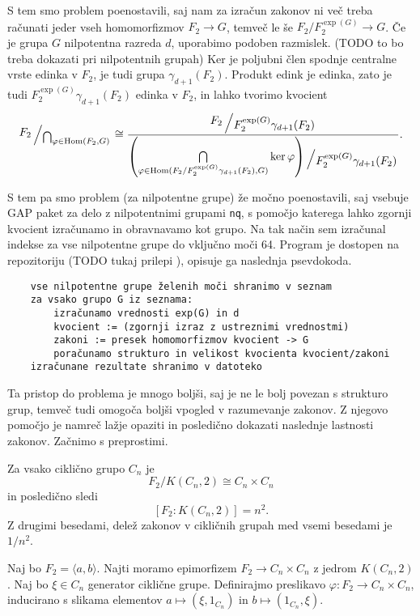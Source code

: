 \documentclass[mat1, tisk]{fmfdelo}
\newcommand{\bigslant}[2]{{\raisebox{.2em}{$#1$}\left/\raisebox{-.2em}{$#2$}\right.}}
\numberwithin{equation}{section}  %
\begin{document}
S tem smo problem poenostavili, saj nam za izračun zakonov ni več treba računati jeder vseh homomorfizmov $F_2 \to G$, temveč le še $F_2 / F_2^{\exp(G)} \to G$.
Če je grupa $G$ nilpotentna razreda $d$, uporabimo podoben razmislek. 
 (TODO to bo treba dokazati pri nilpotentnih grupah) 
Ker je poljubni člen spodnje centralne vrste edinka v $F_2$, je tudi grupa $\gamma_{d+ 1}(F_2)$.
Produkt edink je edinka, zato je tudi $F_2^{\exp(G)} \gamma_{d+ 1}(F_2)$ edinka v $F_2$, in lahko tvorimo kvocient 
\begin{equation*}
    \bigslant{F_2}{\bigcap_{\varphi \in \operatorname{Hom}(F_2, G)}} \cong \dfrac{\bigslant{F_2}{F_2^{\exp(G)}\gamma_{d+1}(F_2)}}{ \bigslant{ \left( \bigcap\limits_{\varphi \in \operatorname{Hom}({F_2} / {F_2^{\exp(G)}\gamma_{d+1}(F_2)}, G)} \ker \varphi \right) }{F_2^{\exp(G)}\gamma_{d+1}(F_2)}}.
\end{equation*}

S tem pa smo problem (za nilpotentne grupe) že močno poenostavili, saj vsebuje GAP paket za delo z nilpotentnimi grupami \texttt{nq}, s pomočjo katerega lahko zgornji kvocient izračunamo in obravnavamo kot grupo.
Na tak način sem izračunal indekse za vse nilpotentne grupe do vključno moči 64. Program je dostopen na repozitoriju (TODO tukaj prilepi ), opisuje ga naslednja psevdokoda. 

\begin{verbatim}
    vse nilpotentne grupe želenih moči shranimo v seznam 
    za vsako grupo G iz seznama:
        izračunamo vrednosti exp(G) in d
        kvocient := (zgornji izraz z ustreznimi vrednostmi)
        zakoni := presek homomorfizmov kvocient -> G
        poračunamo strukturo in velikost kvocienta kvocient/zakoni
    izračunane rezultate shranimo v datoteko
\end{verbatim}

Ta pristop do problema je mnogo boljši, saj je ne le bolj povezan s strukturo grup, temveč tudi omogoča boljši vpogled v razumevanje zakonov.
Z njegovo pomočjo je namreč lažje opaziti in posledično dokazati naslednje lastnosti zakonov. Začnimo s preprostimi.

\begin{trditev}
\label{trd_lastnosti_zakonov_ciklicne}
 Za vsako ciklično grupo $C_n$ je \begin{equation*}
 F_2 / K(C_n, 2) \cong C_n \times C_n
 \end{equation*}  
 in posledično sledi \begin{equation*}
\left[ F_2 : K(C_n, 2) \right] = n^2.
 \end{equation*}  
Z drugimi besedami, delež zakonov v cikličnih grupah med vsemi besedami je $1 / n^2$.
\end{trditev}
\begin{dokaz}
Naj bo $F_2 = \langle a, b \rangle$.
Najti moramo epimorfizem $F_2 \to C_n \times C_n$ z jedrom $K(C_n ,2)$. Naj bo $\xi \in C_n$ generator ciklične grupe. Definirajmo preslikavo $\varphi: F_2 \to C_n \times C_n$,
inducirano s slikama elementov $a \mapsto (\xi, 1_{C_n})$ in $b \mapsto (1_{C_n}, \xi)$.
\end{dokaz}
\end{document}
